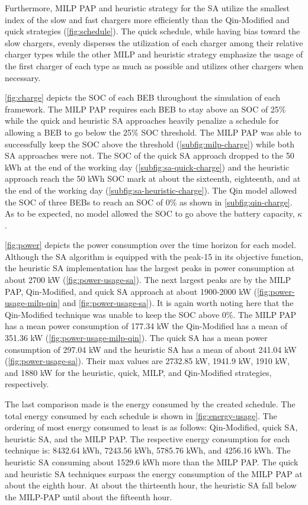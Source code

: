 \documentclass[11pt,a4paper,final]{article}
\begin{document}
Furthermore, MILP PAP and heuristic strategy for the SA utilize the smallest index of the slow and fast chargers more
efficiently than the Qin-Modified and quick strategies (\ref{fig:schedule}). The quick schedule, while having bias
toward the slow chargers, evenly disperses the utilization of each charger among their relative charger types while the
other MILP and heuristic strategy emphasize the usage of the first charger of each type as much as possible and utilizes
other chargers when necessary.

\ref{fig:charge} depicts the SOC of each BEB throughout the simulation of each framework. The MILP PAP requires each BEB
to stay above an SOC of 25\% while the quick and heuristic SA approaches heavily penalize a schedule for allowing a BEB
to go below the 25\% SOC threshold. The MILP PAP was able to successfully keep the SOC above the threshold
(\ref{subfig:milp-charge}) while both SA approaches were not. The SOC of the quick SA approach dropped to the 50 kWh at
the end of the working day (\ref{subfig:sa-quick-charge}) and the heuristic approach reach the 50 kWh SOC mark at about
the sixteenth, eighteenth, and at the end of the working day (\ref{subfig:sa-heuristic-charge}). The Qin model allowed
the SOC of three BEBs to reach an SOC of 0\% as shown in \ref{subfig:qin-charge}. As to be expected, no model allowed the
SOC to go above the battery capacity, \(\kappa\).

\ref{fig:power} depicts the power consumption over the time horizon for each model. Although the SA algorithm is
equipped with the peak-15 in its objective function, the heuristic SA implementation has the largest peaks in power
consumption at about 2700 kW (\ref{fig:power-usage-sa}). The next largest peaks are by the MILP PAP, Qin-Modified, and
quick SA approach at about 1900-2000 kW (\ref{fig:power-usage-milp-qin} and \ref{fig:power-usage-sa}). It is again worth
noting here that the Qin-Modified technique was unable to keep the SOC above 0\%. The MILP PAP has a mean power
consumption of 177.34 kW the Qin-Modified has a mean of 351.36 kW (\ref{fig:power-usage-milp-qin}). The quick SA has a
mean power consumption of 297.04 kW and the heuristic SA has a mean of about 241.04 kW (\ref{fig:power-usage-sa}). Their
max values are 2732.85 kW, 1941.9 kW, 1910 kW, and 1880 kW for the heuristic, quick, MILP, and Qin-Modified strategies,
respectively.

The last comparison made is the energy consumed by the created schedule. The total energy consumed by each schedule is
shown in \ref{fig:energy-usage}. The ordering of most energy consumed to least is as follows: Qin-Modified, quick SA,
heuristic SA, and the MILP PAP. The respective energy consumption for each technique is: 8432.64 kWh, 7243.56 kWh,
5785.76 kWh, and 4256.16 kWh. The heuristic SA consuming about 1529.6 kWh more than the MILP PAP. The quick and
heuristic SA techniques surpass the energy consumption of the MILP PAP at about the eighth hour. At about the thirteenth
hour, the heuristic SA fall below the MILP-PAP until about the fifteenth hour.
\end{document}
